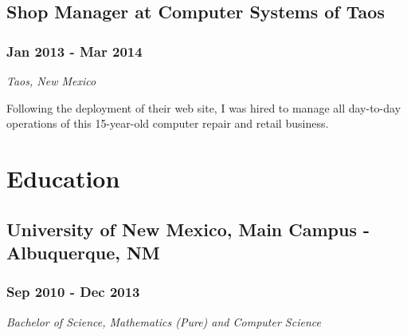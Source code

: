 \documentclass[letterpaper]{article}
\begin{document}
\subsection{Shop Manager at Computer Systems of Taos}
\label{sec-3-4}
\subsubsection{Jan 2013 - Mar 2014}
\label{sec-3-4-1}
\emph{Taos, New Mexico}\\
\vspace{0.1in}

Following the deployment of their web site, I was hired to manage all day-to-day operations of this 15-year-old computer repair and retail business.

\section{Education}
\label{sec-4}

\subsection{University of New Mexico, Main Campus - Albuquerque, NM}
\label{sec-4-1}
\subsubsection{Sep 2010 - Dec 2013}
\label{sec-4-1-1}
\emph{Bachelor of Science, Mathematics (Pure) and Computer Science}
\end{document}
